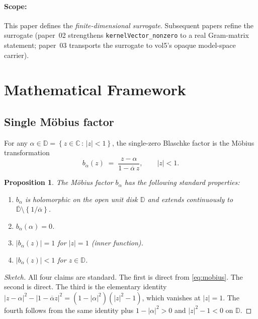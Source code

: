 \documentclass[11pt]{article}
\theoremstyle{plain}
\newtheorem{proposition}[theorem]{Proposition}
\theoremstyle{definition}
\theoremstyle{remark}
\newcommand{\C}{\mathbb{C}}
\newcommand{\D}{\mathbb{D}}
\newcommand{\conj}[1]{\overline{#1}}
\newcommand{\Set}[1]{\left\{ #1 \right\}}
\newcommand{\code}[1]{\texttt{#1}}
\begin{document}
\paragraph{Scope:}  This paper defines the \emph{finite-dimensional
surrogate}.  Subsequent papers refine the surrogate (paper~02 strengthens
\code{kernelVector\_nonzero} to a real Gram-matrix statement; paper~03
transports the surrogate to vol5's opaque model-space carrier).

\section{Mathematical Framework}\label{sec:framework}

\subsection{Single Möbius factor}

For any $\alpha\in\D = \Set{z\in\C \,:\, |z|<1}$, the single-zero Blaschke
factor is the Möbius transformation
\begin{equation}\label{eq:mobius}
  b_{\alpha}(z) \;=\; \frac{z-\alpha}{1-\conj{\alpha}\,z}, \qquad |z|<1.
\end{equation}

\begin{proposition}\label{prop:mobius-properties}
The Möbius factor $b_{\alpha}$ has the following standard properties:
\begin{enumerate}
  \item $b_{\alpha}$ is holomorphic on the open unit disk $\D$ and extends
        continuously to $\overline{\D}\setminus\Set{1/\conj{\alpha}}$.
  \item $b_{\alpha}(\alpha)=0$.
  \item $|b_{\alpha}(z)| = 1$ for $|z|=1$ (inner function).
  \item $|b_{\alpha}(z)|<1$ for $z\in\D$.
\end{enumerate}
\end{proposition}

\begin{proof}[Sketch]
All four claims are standard.  The first is direct from
\eqref{eq:mobius}.  The second is direct.  The third is the elementary
identity
\(|z-\alpha|^{2} - |1-\conj{\alpha}z|^{2}
   = (1-|\alpha|^{2})(|z|^{2}-1)\),
which vanishes at $|z|=1$.  The fourth follows from the same identity
plus $1-|\alpha|^{2}>0$ and $|z|^{2}-1<0$ on $\D$.
\end{proof}
\end{document}
